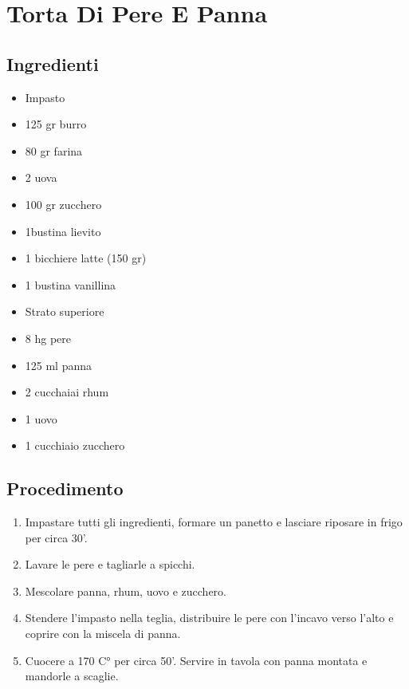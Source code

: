 \section{Torta Di Pere E Panna}
\subsection{Ingredienti}
\begin{itemize}
\item Impasto  
\item 125 gr burro  
\item 80 gr farina  
\item 2 uova  
\item 100 gr zucchero  
\item 1bustina lievito  
\item 1 bicchiere latte (150 gr)  
\item 1 bustina vanillina  
\item Strato superiore  
\item 8 hg pere  
\item 125 ml panna  
\item 2 cucchaiai rhum  
\item 1 uovo  
\item 1 cucchiaio zucchero
\end{itemize}
\subsection{Procedimento}
\begin{enumerate}
\item  Impastare tutti gli ingredienti, formare un panetto e lasciare riposare in frigo per circa 30'.   
\item  Lavare le pere e tagliarle a spicchi.   
\item  Mescolare panna, rhum, uovo e zucchero.  
\item  Stendere l'impasto nella teglia, distribuire le pere con l'incavo verso l'alto e coprire con la miscela di panna.  
\item  Cuocere a 170 C° per circa 50'. Servire in tavola con panna montata e mandorle a scaglie.
\end{enumerate}
